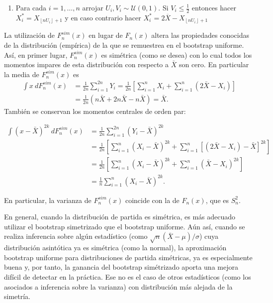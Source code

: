 \documentclass[
]{book}
\providecommand{\tightlist}{%
  \setlength{\itemsep}{0pt}\setlength{\parskip}{0pt}}
\theoremstyle{break}
\theoremstyle{nonumberplain}
\begin{document}
\begin{enumerate}
\def\labelenumi{\arabic{enumi}.}
\tightlist
\item
  Para cada \(i=1,\ldots ,n\) arrojar
  \(U_i,V_i\sim \mathcal{U}\left( 0,1 \right)\). Si \(V_i\leq \frac{1}{2}\)
  entonces hacer \(X_i^{\ast}=X_{\left\lfloor
  nU_i\right\rfloor +1}\) y en caso contrario hacer
  \(X_i^{\ast}=2\overline{X
  }-X_{\left\lfloor nU_i\right\rfloor +1}\)
\end{enumerate}

La utilización de \(F_n^{sim}\left( x \right)\) en lugar de \(F_n\left(
x \right)\) altera las propiedades conocidas de la distribución
(empírica) de la que se remuestrea en el bootstrap uniforme. Así, en
primer lugar, \(F_n^{sim}\left( x \right)\) es simétrica (como se desea)
con lo cual todos los momentos impares de esta distribución con respecto
a \(\bar{X}\) son cero.
En particular la media de \(F_n^{sim}\left(x \right)\) es
\[\begin{aligned}
\int x~dF_n^{sim}\left( x \right) &= \frac{1}{2n}\sum_{i=1}^{2n}Y_i=\frac{
1}{2n}\left[ \sum_{i=1}^{n}X_i+\sum_{i=1}^{n}\left( 2\bar{X}
-X_i \right) \right] \\
&= \frac{1}{2n}\left( n\bar{X}+2n\bar{X}-n\bar{X} \right) =
\bar{X}.\end{aligned}\]
También se conservan los momentos centrales de orden par:

\[\begin{aligned}
\int \left( x-\bar{X} \right)^{2k}~dF_n^{sim}\left( x \right) &= \frac{
1}{2n}\sum_{i=1}^{2n}\left( Y_i-\bar{X} \right)^{2k} \\
&= \frac{1}{2n}\left[ \sum_{i=1}^{n}\left( X_i-\bar{X} \right)
^{2k}+\sum_{i=1}^{n}\left[ \left( 2\bar{X}-X_i \right) -\bar{X}
\right]^{2k}\right] \\
&= \frac{1}{2n}\left[ \sum_{i=1}^{n}\left( X_i-\bar{X} \right)
^{2k}+\sum_{i=1}^{n}\left( \bar{X}-X_i \right)^{2k}\right] \\
&= \frac{1}{n}\sum_{i=1}^{n}\left( X_i-\bar{X} \right)^{2k}.
\end{aligned}\]

En particular, la varianza de \(F_n^{sim}\left( x \right)\) coincide con
la de \(F_n\left( x \right)\), que es \(S_n^2\).

En general, cuando la distribución de partida es simétrica, es más
adecuado utilizar el bootstrap simetrizado que el bootstrap uniforme.
Aún así, cuando se realiza inferencia sobre algún estadístico (como
\(\sqrt{n}(\bar{X}-\mu)/\sigma\)) cuya distribución
asintótica ya es simétrica (como la normal), la aproximación bootstrap
uniforme para distribuciones de partida simétricas, ya es especialmente
buena y, por tanto, la ganancia del bootstrap simétrizado aporta una
mejora difícil de detectar en la práctica. Ese no es el caso de otros
estadísticos (como los asociados a inferencia sobre la varianza) con
distribución más alejada de la simetría.
\end{document}
